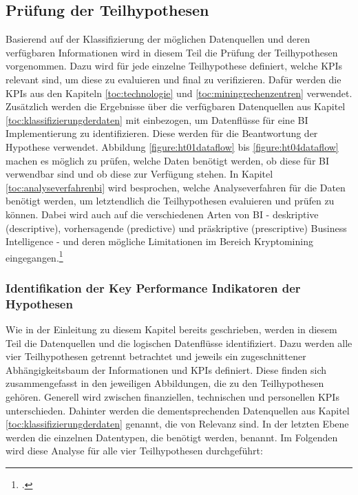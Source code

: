 \subsection{Prüfung der Teilhypothesen} \label{toc:pruefungderteilhypothesen}

Basierend auf der Klassifizierung der möglichen Datenquellen und deren verfügbaren Informationen wird in diesem Teil die Prüfung
der Teilhypothesen vorgenommen. Dazu wird für jede einzelne Teilhypothese definiert, welche \acp{KPI} relevant sind, um diese
zu evaluieren und final zu verifizieren. Dafür werden die \acp{KPI} aus den Kapiteln \ref{toc:technologie} und
\ref{toc:miningrechenzentren} verwendet. Zusätzlich werden die Ergebnisse über die verfügbaren Datenquellen aus Kapitel
\ref{toc:klassifizierungderdaten} mit einbezogen, um Datenflüsse für eine \ac{BI} Implementierung zu identifizieren. Diese
werden für die Beantwortung der Hypothese verwendet. Abbildung \ref{figure:ht01dataflow} bis \ref{figure:ht04dataflow} machen
es möglich zu prüfen, welche Daten benötigt werden, ob diese für \ac{BI} verwendbar sind und ob diese zur Verfügung stehen.
In Kapitel \ref{toc:analyseverfahrenbi} wird besprochen, welche Analyseverfahren für die Daten benötigt werden, um letztendlich
die Teilhypothesen evaluieren und prüfen zu können. Dabei wird auch auf die verschiedenen Arten von \ac{BI} - deskriptive
(descriptive), vorhersagende (predictive) und präskriptive (prescriptive) Business Intelligence - und deren mögliche
Limitationen im Bereich Kryptomining eingegangen.\footcite[Vgl.][S. 96]{bihani2014comparative}

\subsubsection{Identifikation der Key Performance Indikatoren der Hypothesen} \label{toc:identifikationkpi}

Wie in der Einleitung zu diesem Kapitel bereits geschrieben, werden in diesem Teil die Datenquellen und die logischen Datenflüsse
identifiziert. Dazu werden alle vier Teilhypothesen getrennt betrachtet und jeweils ein zugeschnittener Abhängigkeitsbaum der
Informationen und \acp{KPI} definiert. Diese finden sich zusammengefasst in den jeweiligen Abbildungen, die zu den Teilhypothesen
gehören. Generell wird zwischen finanziellen, technischen und personellen \acp{KPI} unterschieden. Dahinter werden die
dementsprechenden Datenquellen aus Kapitel \ref{toc:klassifizierungderdaten} genannt, die von Relevanz sind. In der letzten Ebene
werden die einzelnen Datentypen, die benötigt werden, benannt. Im Folgenden wird diese Analyse für alle vier Teilhypothesen
durchgeführt:

